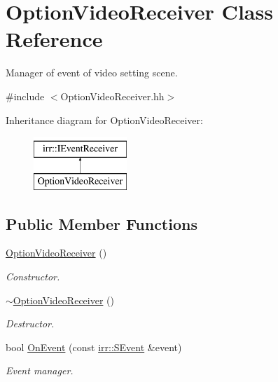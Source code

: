 \hypertarget{classOptionVideoReceiver}{}\section{Option\+Video\+Receiver Class Reference}
\label{classOptionVideoReceiver}


Manager of event of video setting scene.  




{\ttfamily \#include $<$Option\+Video\+Receiver.\+hh$>$}

Inheritance diagram for Option\+Video\+Receiver\+:\begin{figure}[H]
\begin{center}
\leavevmode
\includegraphics[height=2.000000cm]{classOptionVideoReceiver}
\end{center}
\end{figure}
\subsection*{Public Member Functions}
\begin{DoxyCompactItemize}
\item 
\hyperlink{classOptionVideoReceiver_ac513ff2e3b42ab38dc47b07ece611a61}{Option\+Video\+Receiver} ()
\begin{DoxyCompactList}\small\item\em Constructor. \end{DoxyCompactList}\item 
\hyperlink{classOptionVideoReceiver_ab014b77305c68f220fa5a0c8e9e57cb9}{$\sim$\+Option\+Video\+Receiver} ()
\begin{DoxyCompactList}\small\item\em Destructor. \end{DoxyCompactList}\item 
bool \hyperlink{classOptionVideoReceiver_a203025900c489eb2df12a6b3471c3caa}{On\+Event} (const \hyperlink{structirr_1_1SEvent}{irr\+::\+S\+Event} \&event)
\begin{DoxyCompactList}\small\item\em Event manager. \end{DoxyCompactList}\end{DoxyCompactItemize}


